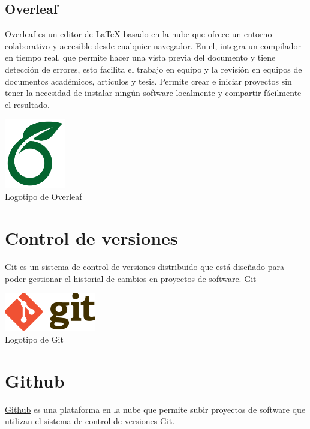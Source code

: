 \subsection{Overleaf}

Overleaf es un editor de LaTeX basado en la nube que ofrece un entorno colaborativo y accesible desde cualquier navegador. En el, integra un compilador en tiempo real, que permite hacer una vista previa del documento y tiene detección de errores, esto facilita el trabajo en equipo y la revisión en equipos de documentos académicos, artículos y tesis. Permite crear e iniciar proyectos sin tener la necesidad de instalar ningún software localmente y compartir fácilmente el resultado.

\begin{center}
  \includegraphics[width=0.2\textwidth]{img/overleaf-logo.jpg}\\
  \small Logotipo de Overleaf
\end{center}

\section{Control de versiones}\label{control-versiones}
Git es un sistema de control de versiones distribuido que está diseñado para poder gestionar el historial de cambios en proyectos de software.
\href{https://git-scm.com/}{Git}

\begin{center}
  \includegraphics[width=0.3\textwidth]{img/git-logo.png}\\
  \small Logotipo de Git
\end{center}


\section{Github}\label{github}
\href{https://github.com/}{Github} es una plataforma en la nube que permite subir proyectos de software que utilizan el sistema de control de versiones Git. 

